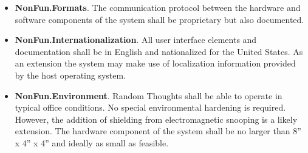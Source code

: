 \begin{itemize}
\item \textbf{NonFun.Formats}. The communication protocol between the hardware and software
  components of the system shall be proprietary but also documented.

\item \textbf{NonFun.Internationalization}. All user interface elements and documentation shall
  be in English and nationalized for the United States. As an extension the system may make use
  of localization information provided by the host operating system.

\item \textbf{NonFun.Environment}. Random Thoughts shall be able to operate in typical office
  conditions. No special environmental hardening is required. However, the addition of shielding
  from electromagnetic snooping is a likely extension. The hardware component of the system
  shall be no larger than 8'' x 4'' x 4'' and ideally as small as feasible.

\end{itemize}